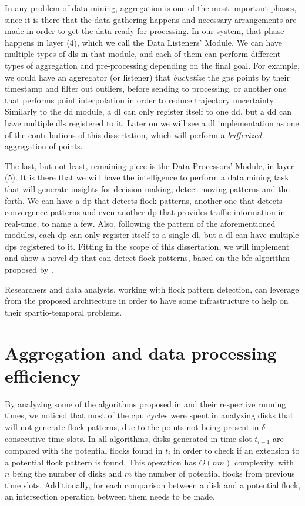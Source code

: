 In any problem of data mining, aggregation is one of the most important phases, since it is there that the data
gathering happens and necessary arrangements are made in order to get the data ready for processing. In our system, that
phase happens in layer (4), which we call the Data Listeners' Module. We can have multiple types of \acp{dl} in that
module, and each of them can perform different types of aggregation and pre-processing depending on the final goal. For
example, we could have an aggregator (or listener) that \textit{bucketize} the \ac{gps} points by their timestamp and
filter out outliers, before sending to processing, or another one that performs point interpolation in order to reduce
trajectory uncertainty. Similarly to the \ac{dd} module, a \ac{dl} can only register itself to one \ac{dd}, but a
\ac{dd} can have multiple \acp{dl} registered to it. Later on we will see a \ac{dl} implementation as one of the
contributions of this dissertation, which will perform a \textit{bufferized} aggregation of points.

The last, but not least, remaining piece is the Data Processors' Module, in layer (5). It is there that we will have the
intelligence to perform a data mining task that will generate insights for decision making, detect moving patterns and
the forth. We can have a \ac{dp} that detects flock patterns, another one that detects convergence patterns and even
another \ac{dp} that provides traffic information in real-time, to name a few. Also, following the pattern of the
aforementioned modules, each \ac{dp} can only register itself to a single \ac{dl}, but a \ac{dl} can have multiple
\acp{dp} registered to it. Fitting in the scope of this dissertation, we will implement and show a novel \ac{dp} that
can detect flock patterns, based on the \ac{bfe} algorithm proposed by .

Researchers and data analysts, working with flock pattern detection, can leverage from the proposed architecture in
order to have some infrastructure to help on their spartio-temporal problems.

\section{Aggregation and data processing efficiency}
\label{sec:aggreg_efficiency}
By analyzing some of the algorithms proposed in  and their respective running times, we noticed
that most of the \ac{cpu} cycles were spent in analyzing disks that will not generate flock patterns, due to the points
not being present in $\delta$ consecutive time slots. In all algorithms, disks generated in time slot $t_{i+1}$ are
compared with the potential flocks found in $t_{i}$ in order to check if an extension to a potential flock pattern is
found. This operation has $O(nm)$ complexity, with $n$ being the number of disks and $m$ the number of potential flocks
from previous time slots. Additionally, for each comparison between a disk and a potential flock, an intersection
operation between them needs to be made.


